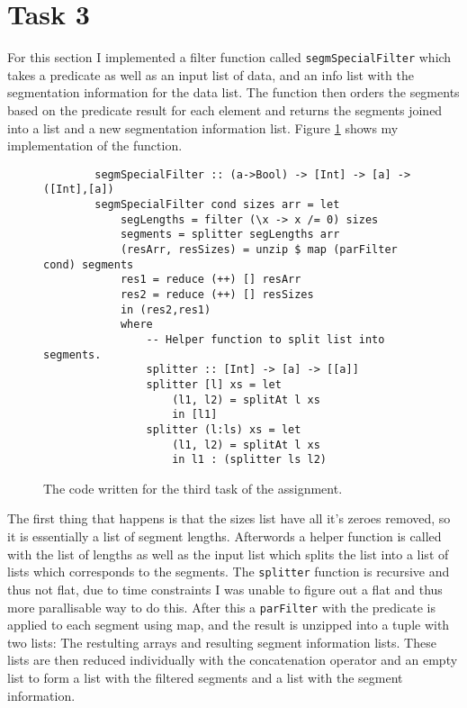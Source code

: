 \section{Task 3}

For this section I implemented a filter function called
\texttt{segmSpecialFilter} which takes a predicate as well as an input list of
data, and an info list with the segmentation information for the data list. The
function then orders the segments based on the predicate result for each element
and returns the segments joined into a list and a new segmentation information
list. Figure \ref{fig:t3code} shows my implementation of the function.

\begin{figure}[ht]
    \begin{lstlisting}
        segmSpecialFilter :: (a->Bool) -> [Int] -> [a] -> ([Int],[a])
        segmSpecialFilter cond sizes arr = let
            segLengths = filter (\x -> x /= 0) sizes
            segments = splitter segLengths arr
            (resArr, resSizes) = unzip $ map (parFilter cond) segments
            res1 = reduce (++) [] resArr
            res2 = reduce (++) [] resSizes
            in (res2,res1)
            where
                -- Helper function to split list into segments.
                splitter :: [Int] -> [a] -> [[a]]
                splitter [l] xs = let
                    (l1, l2) = splitAt l xs
                    in [l1]
                splitter (l:ls) xs = let
                    (l1, l2) = splitAt l xs
                    in l1 : (splitter ls l2)
    \end{lstlisting}
    \caption{The code written for the third task of the assignment.}
    \label{fig:t3code}
\end{figure}

The first thing that happens is that the sizes list have all it's zeroes
removed, so it is essentially a list of segment lengths. Afterwords a helper
function is called with the list of lengths as well as the input list which
splits the list into a list of lists which corresponds to the segments. The
\texttt{splitter} function is recursive and thus not flat, due to time
constraints I was unable to figure out a flat and thus more parallisable way to
do this. After this a \texttt{parFilter} with the predicate is applied to each
segment using map, and the result is unzipped into a tuple with two lists: The
restulting arrays and resulting segment information lists. These lists are then
reduced individually with the concatenation operator and an empty list to form a
list with the filtered segments and a list with the segment information.
